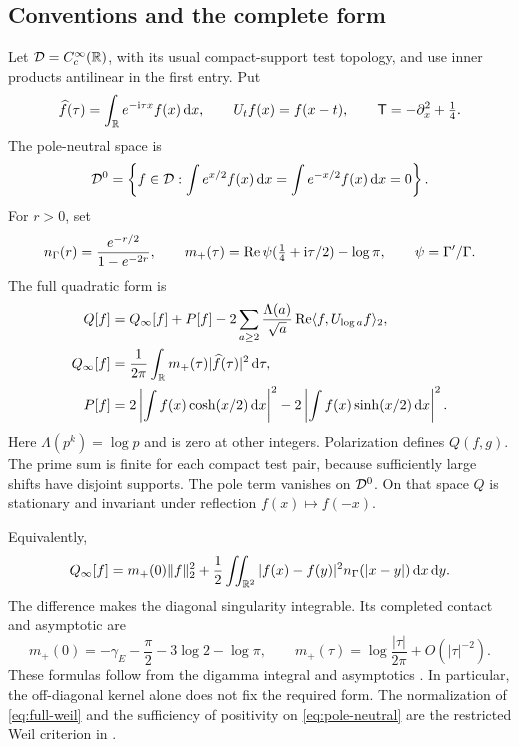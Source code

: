 \subsection{Conventions and the complete form}
Let $\mathcal D=C_c^\infty(\mathbb R)$, with its usual compact-support test topology,
and use inner products antilinear in the first entry. Put
\begin{equation}
\widehat f(\tau)=\int_\mathbb R e^{-\mathrm i\tau x}f(x)\,\mathrm d x,
\qquad U_tf(x)=f(x-t),\qquad
\mathsf T=-\partial_x^2+\tfrac14.
\end{equation}
The pole-neutral space is
\begin{equation}\label{eq:pole-neutral}
\mathcal D^0=\left\{f\in\mathcal D:
\int e^{x/2}f(x)\,\mathrm d x=\int e^{-x/2}f(x)\,\mathrm d x=0\right\}.
\end{equation}
For $r>0$, set
\begin{equation}
n_\Gamma(r)=\frac{e^{-r/2}}{1-e^{-2r}},\qquad
m_+(\tau)=\operatorname{Re}\psi(\tfrac14+\mathrm i\tau/2)-\log\pi,
\qquad \psi=\Gamma'/\Gamma.
\end{equation}
The full quadratic form is
\begin{align}\label{eq:full-weil}
Q[f]&=Q_\infty[f]+P[f]
-2\sum_{a\ge2}\frac{\Lambda(a)}{\sqrt a}
          \operatorname{Re}\langle f,U_{\log a}f\rangle_2,\\
Q_\infty[f]&=\frac1{2\pi}\int_\mathbb R m_+(\tau)|\widehat f(\tau)|^2\,\mathrm d\tau,
\label{eq:arch-fourier}\\
P[f]&=2\left|\int f(x)\cosh(x/2)\,\mathrm d x\right|^2
      -2\left|\int f(x)\sinh(x/2)\,\mathrm d x\right|^2.
\end{align}
Here $\Lambda(p^k)=\log p$ and is zero at other integers.
Polarization defines $Q(f,g)$. The prime sum is finite for each compact
test pair, because sufficiently large shifts have disjoint supports.
The pole term vanishes on $\mathcal D^0$. On that space $Q$ is stationary
and invariant under reflection $f(x)\mapsto f(-x)$.

Equivalently,
\begin{equation}\label{eq:arch-difference}
Q_\infty[f]=m_+(0)\lVert f\rVert_2^2+
\frac12\iint_{\mathbb R^2}|f(x)-f(y)|^2n_\Gamma(|x-y|)\,\mathrm d x\,\mathrm d y.
\end{equation}
The difference makes the diagonal singularity integrable. Its completed
contact and asymptotic are
\begin{equation}\label{eq:contact-growth}
m_+(0)=-\gamma_{\!E}-\frac\pi2-3\log2-\log\pi,
\qquad
m_+(\tau)=\log\frac{|\tau|}{2\pi}+O(|\tau|^{-2}).
\end{equation}
These formulas follow from the digamma integral and asymptotics
\cite{dlmf}. In particular, the off-diagonal kernel alone does not fix
the required form. The normalization of \eqref{eq:full-weil} and the
sufficiency of positivity on \eqref{eq:pole-neutral} are the restricted
Weil criterion in \cite[Appendices B--C]{cc}.

